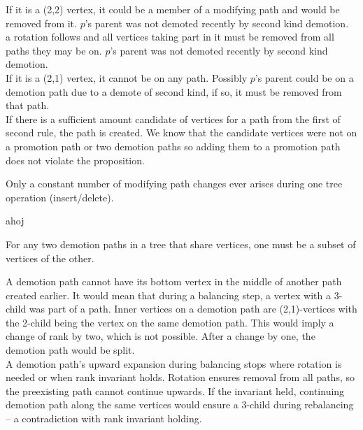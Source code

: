 \begin{myproof}
If it is a (2,2) vertex, it could be a member of a modifying path and would be removed from it. $p$'s parent was not demoted recently by second kind demotion.\\a rotation follows and all vertices taking part in it must be removed from all paths they may be on. $p$'s parent was not demoted recently by second kind demotion.\\
If it is a (2,1) vertex, it cannot be on any path. Possibly $p$'s parent could be on a demotion path due to a demote of second kind, if so, it must be removed from that path.\\
If there is a sufficient amount candidate of vertices for a path from the first of second rule, the path is created. We know that the candidate vertices were not on a promotion path or two demotion paths so adding them to a promotion path does not violate the proposition.\\
\end{myproof}

\begin{prop}
Only a constant number of modifying path changes ever arises during one tree operation (insert/delete).
\end{prop}

\begin{myproof}
ahoj
\end{myproof}

\begin{prop}
For any two demotion paths in a tree that share vertices, one must be a subset of vertices of the other.
\end{prop}

\begin{myproof}
A demotion path cannot have its bottom vertex in the middle of another path created earlier. It would mean that during a balancing step, a vertex with a 3-child was part of a path. Inner vertices on a demotion path are (2,1)-vertices with the 2-child being the vertex on the same demotion path. This would imply a change of rank by two, which is not possible. After a change by one, the demotion path would be split.\\
A demotion path's upward expansion during balancing stops where rotation is needed or when rank invariant holds. Rotation ensures removal from all paths, so the preexisting path cannot continue upwards. If the invariant held, continuing demotion path along the same vertices would ensure a 3-child during rebalancing -- a contradiction with rank invariant holding. 
\end{myproof}


